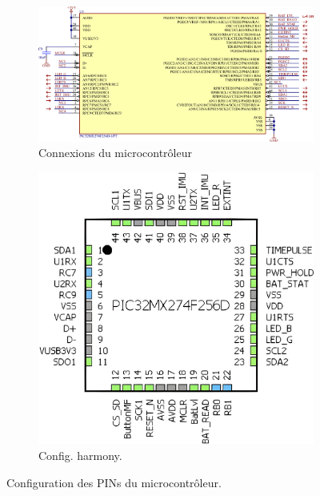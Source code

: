 \begin{figure}[h]
	\centering
	\begin{subfigure}[b]{0.6\textwidth}
		\centering
		\includegraphics[width=1\linewidth]{../figures/etude/sch/MCU}
		\caption{Connexions du microcontrôleur}
		\label{fig:mcu}
	\end{subfigure}
	\hfill
	\begin{subfigure}[b]{0.3\textwidth}
		\centering
		\includegraphics[width=1\linewidth]{../figures/etude/sch/MCU-HARMONY}
		\caption{Config. \gls{harmony}.}
		\label{fig:mcu-harmony}
	\end{subfigure}
	\hfill
	\caption{Configuration des PINs du microcontrôleur.}
	\label{fig:sch-connMcu}
\end{figure}

